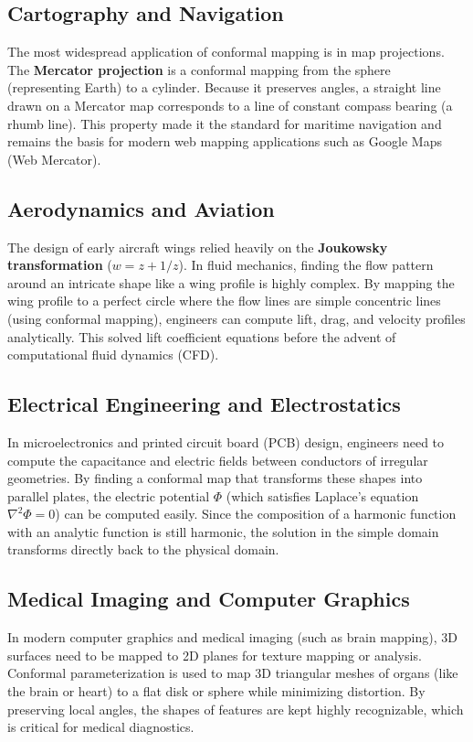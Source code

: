 \documentclass[12pt,a4paper]{article}
\begin{document}
\subsection{Cartography and Navigation}
The most widespread application of conformal mapping is in map projections. The \textbf{Mercator projection} is a conformal mapping from the sphere (representing Earth) to a cylinder. Because it preserves angles, a straight line drawn on a Mercator map corresponds to a line of constant compass bearing (a rhumb line). This property made it the standard for maritime navigation and remains the basis for modern web mapping applications such as Google Maps (Web Mercator).

\subsection{Aerodynamics and Aviation}
The design of early aircraft wings relied heavily on the \textbf{Joukowsky transformation} ($w = z + 1/z$). In fluid mechanics, finding the flow pattern around an intricate shape like a wing profile is highly complex. By mapping the wing profile to a perfect circle where the flow lines are simple concentric lines (using conformal mapping), engineers can compute lift, drag, and velocity profiles analytically. This solved lift coefficient equations before the advent of computational fluid dynamics (CFD).

\subsection{Electrical Engineering and Electrostatics}
In microelectronics and printed circuit board (PCB) design, engineers need to compute the capacitance and electric fields between conductors of irregular geometries. By finding a conformal map that transforms these shapes into parallel plates, the electric potential $\Phi$ (which satisfies Laplace's equation $\nabla^2 \Phi = 0$) can be computed easily. Since the composition of a harmonic function with an analytic function is still harmonic, the solution in the simple domain transforms directly back to the physical domain.

\subsection{Medical Imaging and Computer Graphics}
In modern computer graphics and medical imaging (such as brain mapping), 3D surfaces need to be mapped to 2D planes for texture mapping or analysis. Conformal parameterization is used to map 3D triangular meshes of organs (like the brain or heart) to a flat disk or sphere while minimizing distortion. By preserving local angles, the shapes of features are kept highly recognizable, which is critical for medical diagnostics.
\end{document}
